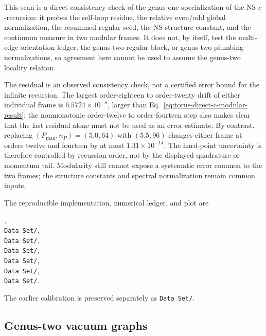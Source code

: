 \documentclass[11pt]{article}
\begin{document}
This scan is a direct consistency check of the genus-one specialization of
the NS \(c\)-recursion: it probes the self-loop residue, the relative
even/odd global normalization, the resummed regular seed, the NS structure
constant, and the continuum measure in two modular frames.  It does not, by
itself, test the multi-edge orientation ledger, the genus-two regular block,
or genus-two plumbing normalizations, so agreement here cannot be used to
assume the genus-two locality relation.

The residual is an observed consistency check, not a certified error bound
for the infinite recursion.  The largest order-eighteen to order-twenty drift
of either individual frame is \(6.5724\times10^{-8}\), larger than
Eq.~\eqref{eq:torus-direct-c-modular-result}; the nonmonotonic order-twelve to
order-fourteen step also makes clear that the last residual alone must not be
used as an error estimate.  By contrast, replacing \((P_{\max},n_P)=(5.0,64)\)
with \((5.5,96)\) changes either frame at orders twelve and fourteen by at most
\(1.31\times10^{-14}\).  The hard-point uncertainty is therefore controlled
by recursion order, not by the displayed quadrature or momentum tail.
Modularity still cannot expose a systematic error common to the two frames;
the structure constants and spectral normalization remain common inputs.

The reproducible implementation, numerical ledger, and plot are
\begin{center}
 ,\\
 \texttt{Data Set/},\\
 \texttt{Data Set/},\\
 \texttt{Data Set/},\\
 \texttt{Data Set/},\\
 \texttt{Data Set/},\\
 \texttt{Data Set/}.
\end{center}
The earlier calibration is preserved separately as
\texttt{Data Set/}.

\subsection{Genus-two vacuum graphs}
\end{document}
